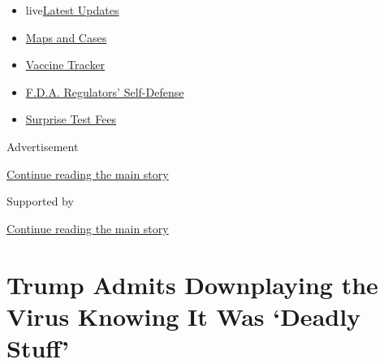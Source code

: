 \begin{itemize}
\tightlist
\item
  live\href{https://www.nytimes3xbfgragh.onion/2020/09/12/world/covid-19-coronavirus.html?name=styln-coronavirus-national\&region=TOP_BANNER\&block=storyline_menu_recirc\&action=click\&pgtype=Article\&impression_id=88f93121-f52c-11ea-8c5a-0b503289d8d2\&variant=undefined}{Latest
  Updates}
\item
  \href{https://www.nytimes3xbfgragh.onion/interactive/2020/us/coronavirus-us-cases.html?name=styln-coronavirus-national\&region=TOP_BANNER\&block=storyline_menu_recirc\&action=click\&pgtype=Article\&impression_id=88f93122-f52c-11ea-8c5a-0b503289d8d2\&variant=undefined}{Maps
  and Cases}
\item
  \href{https://www.nytimes3xbfgragh.onion/interactive/2020/science/coronavirus-vaccine-tracker.html?name=styln-coronavirus-national\&region=TOP_BANNER\&block=storyline_menu_recirc\&action=click\&pgtype=Article\&impression_id=88f95830-f52c-11ea-8c5a-0b503289d8d2\&variant=undefined}{Vaccine
  Tracker}
\item
  \href{https://www.nytimes3xbfgragh.onion/2020/09/10/us/politics/fda-coronavirus-vaccine.html?name=styln-coronavirus-national\&region=TOP_BANNER\&block=storyline_menu_recirc\&action=click\&pgtype=Article\&impression_id=88f95831-f52c-11ea-8c5a-0b503289d8d2\&variant=undefined}{F.D.A.
  Regulators' Self-Defense}
\item
  \href{https://www.nytimes3xbfgragh.onion/2020/09/09/upshot/coronavirus-surprise-test-fees.html?name=styln-coronavirus-national\&region=TOP_BANNER\&block=storyline_menu_recirc\&action=click\&pgtype=Article\&impression_id=88f95832-f52c-11ea-8c5a-0b503289d8d2\&variant=undefined}{Surprise
  Test Fees}
\end{itemize}

Advertisement

\protect\hyperlink{after-top}{Continue reading the main story}

Supported by

\protect\hyperlink{after-sponsor}{Continue reading the main story}

\hypertarget{trump-admits-downplaying-the-virus-knowing-it-was-deadly-stuff}{%
\section{Trump Admits Downplaying the Virus Knowing It Was `Deadly
Stuff'}\label{trump-admits-downplaying-the-virus-knowing-it-was-deadly-stuff}}

